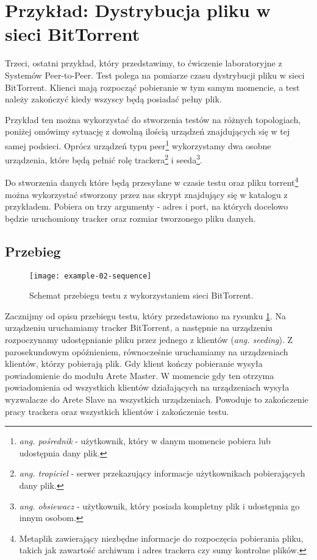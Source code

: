 \documentclass[00-praca-magisterska.tex]{subfiles}
\begin{document}
\section{Przykład: Dystrybucja pliku w sieci BitTorrent}
\label{example-torrent}

Trzeci, ostatni przykład, który przedstawimy, to ćwiczenie laboratoryjne z
Systemów Peer-to-Peer. Test polega na pomiarze czasu dystrybucji pliku w sieci
BitTorrent. Klienci mają rozpocząć pobieranie w tym samym momencie, a test należy
zakończyć kiedy wszyscy będą posiadać pełny plik.


Przykład ten można wykorzystać do stworzenia testów na różnych topologiach,
poniżej omówimy sytuację z dowolną ilością urządzeń znajdujących się w tej samej
podsieci. Oprócz urządzeń typu peer\footnote{\emph{ang. pośrednik} - użytkownik,
który w danym momencie pobiera lub udostępnia dany plik.} wykorzystamy dwa
osobne urządzenia, które będą pełnić rolę trackera\footnote{\emph{ang.
tropiciel} - serwer przekazujący informacje użytkownikach pobierających dany
plik.} i seeda\footnote{\emph{ang. obsiewacz} - użytkownik, który posiada
kompletny plik i udostępnia go innym osobom.}.

Do stworzenia danych które będą przesyłane w czasie testu oraz pliku
torrent\footnote{Metaplik zawierający niezbędne informacje do rozpoczęcia
pobierania pliku, takich jak zawartość archiwum i adres trackera czy sumy
kontrolne plików.} można wykorzystać stworzony przez nas skrypt
 znajdujący się w katalogu z przykładem. Pobiera on
trzy argumenty - adres i port, na których docelowo będzie uruchomiony tracker
oraz rozmiar tworzonego pliku danych.

\subsection{Przebieg}

\begin{figure}[htb]
\begin{center}
\leavevmode
\texttt{[image: example-02-sequence]}
\end{center}
\caption{Schemat przebiegu testu z wykorzystaniem sieci BitTorrent.}
\label{fig:example-02-sequence}
\end{figure}

Zacznijmy od opisu przebiegu testu, który przedstawiono na rysunku
\ref{fig:example-02-sequence}. Na urządzeniu  uruchamiamy tracker
BitTorrent, a następnie na urządzeniu  rozpoczynamy udostępnianie
pliku przez jednego z klientów (\emph{ang. seeding}). Z parosekundowym
opóźnieniem, równocześnie uruchamiamy na urządzeniach  klientów,
którzy pobierają plik. Gdy klient kończy pobieranie wysyła powiadomienie do
modułu Arete Master. W momencie gdy ten otrzyma powiadomienia od wszystkich
klientów działających na urządzeniach  wysyła wyzwalacze do Arete
Slave na wszystkich urządzeniach. Powoduje to zakończenie pracy trackera oraz
wszystkich klientów i zakończenie testu.
\end{document}

